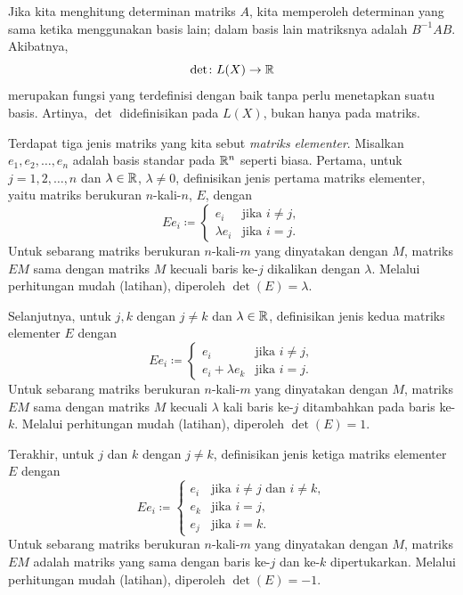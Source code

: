 Jika kita menghitung determinan matriks $A$, kita memperoleh
determinan yang sama ketika menggunakan basis lain;
dalam basis lain matriksnya adalah $B^{-1}AB$.
Akibatnya,
\begin{equation*}
\det \colon L(X) \to \R
\avoidbreak
\end{equation*}
merupakan fungsi yang terdefinisi dengan baik tanpa perlu menetapkan suatu basis.
Artinya, $\det$ didefinisikan pada $L(X)$, bukan hanya pada matriks.

\medskip

Terdapat tiga jenis matriks yang kita sebut
\emph{matriks elementer}.
Misalkan
$e_1,e_2,\ldots,e_n$ adalah basis standar pada ${\mathbb{R}}^n$ seperti biasa.
Pertama,
untuk $j =
1,2,\ldots,n$ dan
$\lambda \in {\mathbb{R}}$, $\lambda \neq 0$, definisikan
jenis pertama matriks elementer,
yaitu matriks
berukuran $n$-kali-$n$, $E$, dengan
\begin{equation*}
Ee_i \coloneqq
\begin{cases}
e_i & \text{jika } i \neq j , \\
\lambda e_i & \text{jika } i = j .
\end{cases}
\end{equation*}
Untuk sebarang matriks berukuran $n$-kali-$m$ yang dinyatakan dengan $M$, matriks $EM$ sama dengan matriks $M$
kecuali baris ke-$j$ dikalikan dengan $\lambda$.
Melalui perhitungan mudah (latihan), diperoleh $\det(E) = \lambda$.

Selanjutnya, untuk $j,k$ dengan $j\neq k$ dan $\lambda \in {\mathbb{R}}$,
definisikan jenis kedua matriks elementer $E$ dengan
\begin{equation*}
Ee_i \coloneqq
\begin{cases}
e_i               & \text{jika } i \neq j , \\
e_i + \lambda e_k & \text{jika } i = j .
\end{cases}
\end{equation*}
Untuk sebarang matriks berukuran $n$-kali-$m$ yang dinyatakan dengan $M$, matriks $EM$ sama dengan matriks $M$
kecuali $\lambda$ kali baris ke-$j$ ditambahkan pada baris ke-$k$.
Melalui perhitungan mudah (latihan), diperoleh $\det(E) = 1$.

Terakhir, untuk $j$ dan $k$ dengan $j\neq k$, definisikan
jenis ketiga matriks elementer $E$ dengan
\begin{equation*}
Ee_i \coloneqq
\begin{cases}
e_i & \text{jika } i \neq j \text{ dan } i \neq k , \\
e_k & \text{jika } i = j , \\
e_j & \text{jika } i = k .
\end{cases}
\end{equation*}
Untuk sebarang matriks berukuran $n$-kali-$m$ yang dinyatakan dengan $M$, matriks $EM$ adalah matriks yang sama dengan
baris ke-$j$ dan ke-$k$ dipertukarkan.
Melalui perhitungan mudah (latihan), diperoleh $\det(E) = -1$.

